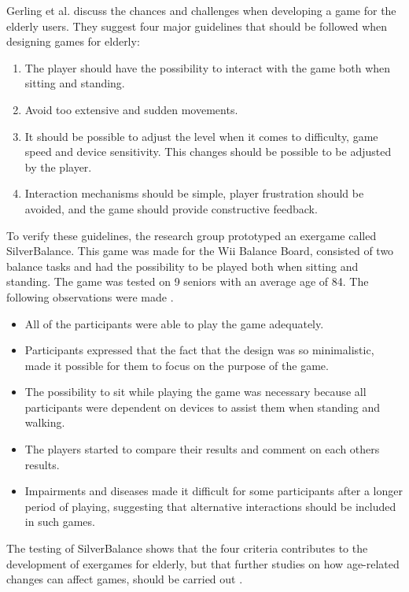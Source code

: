 Gerling et al. \cite{gerling1} discuss the chances and challenges when developing a game for the elderly users. They suggest four major guidelines that should be followed when designing games for elderly:
\begin{enumerate}
\item The player should have the possibility to interact with the game both when sitting and standing. 
\item Avoid too extensive and sudden movements.
\item It should be possible to adjust the level when it comes to difficulty, game speed and device sensitivity. This changes should be possible to be adjusted by the player. 
\item Interaction mechanisms should be simple, player frustration should be avoided, and the game should provide constructive feedback.
\end{enumerate}

To verify these guidelines, the research group prototyped an exergame called SilverBalance. This game was made for the Wii Balance Board, consisted of two balance tasks and had the possibility to be played both when sitting and standing. The game was tested on 9 seniors with an average age of 84. The following observations were made \cite{gerling1}.
\begin{itemize}
\item All of the participants were able to play the game adequately. 
\item Participants expressed that the fact that the design was so minimalistic, made it possible for them to focus on the purpose of the game. 
\item The possibility to sit while playing the game was necessary because all participants were dependent on devices to assist them when standing and walking.
\item The players started to compare their results and comment on each others results.
\item Impairments and diseases made it difficult for some participants after a longer period of playing, suggesting that alternative interactions should be included in such games.
\end{itemize}

The testing of SilverBalance shows that the four criteria contributes to the development of exergames for elderly, but that further studies on how age-related changes can affect games, should be carried out \cite{gerling1}.

